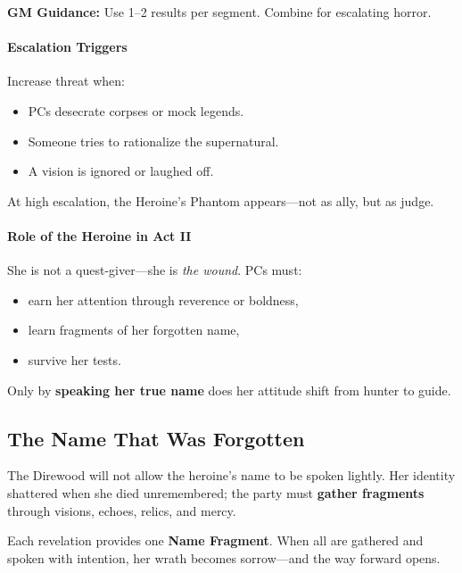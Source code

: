 \documentclass[11pt]{article}
\begin{document}
\textbf{GM Guidance:} Use 1--2 results per segment. Combine for escalating horror.

\paragraph{Escalation Triggers}
Increase threat when:
\begin{itemize}
  \item PCs desecrate corpses or mock legends.
  \item Someone tries to rationalize the supernatural.
  \item A vision is ignored or laughed off.
\end{itemize}

At high escalation, the Heroine's Phantom appears---not as ally, but as judge.

\paragraph{Role of the Heroine in Act II}
She is not a quest-giver---she is \emph{the wound}. PCs must:
\begin{itemize}
  \item earn her attention through reverence or boldness,
  \item learn fragments of her forgotten name,
  \item survive her tests.
\end{itemize}

Only by \textbf{speaking her true name} does her attitude shift from hunter to guide.

\subsection*{The Name That Was Forgotten}

The Direwood will not allow the heroine's name to be spoken lightly. Her identity shattered when she died unremembered; the party must \textbf{gather fragments} through visions, echoes, relics, and mercy.

Each revelation provides one \textbf{Name Fragment}. When all are gathered and spoken with intention, her wrath becomes sorrow---and the way forward opens.

\bigskip
\end{document}
